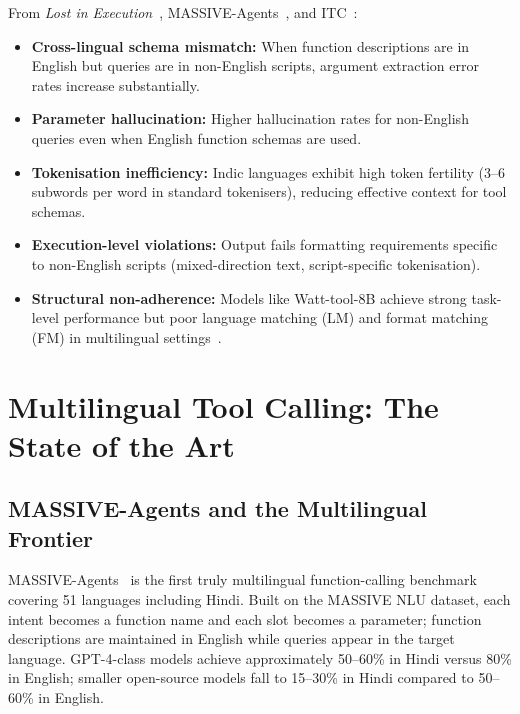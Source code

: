 \documentclass[11pt]{article}
\begin{document}
From \emph{Lost in Execution}~\citep{lostinexecution2025}, MASSIVE-Agents~\citep{massiveagents2025},
and ITC~\citep{itc2025}:
\begin{itemize}[leftmargin=1.2em, itemsep=2pt]
  \item \textbf{Cross-lingual schema mismatch:} When function descriptions are in English but
        queries are in non-English scripts, argument extraction error rates increase substantially.
  \item \textbf{Parameter hallucination:} Higher hallucination rates for non-English queries even
        when English function schemas are used.
  \item \textbf{Tokenisation inefficiency:} Indic languages exhibit high token fertility
        (3--6 subwords per word in standard tokenisers), reducing effective context for tool schemas.
  \item \textbf{Execution-level violations:} Output fails formatting requirements specific to
        non-English scripts (mixed-direction text, script-specific tokenisation).
  \item \textbf{Structural non-adherence:} Models like Watt-tool-8B achieve strong task-level
        performance but poor language matching (LM) and format matching (FM) in multilingual
        settings~\citep{itc2025}.
\end{itemize}

\section{Multilingual Tool Calling: The State of the Art}
\label{sec:multilingual}

\subsection{MASSIVE-Agents and the Multilingual Frontier}

MASSIVE-Agents~\citep{massiveagents2025} is the first truly multilingual function-calling benchmark
covering 51 languages including Hindi. Built on the MASSIVE NLU dataset, each intent becomes a
function name and each slot becomes a parameter; function descriptions are maintained in English
while queries appear in the target language. GPT-4-class models achieve approximately 50--60\% in
Hindi versus 80\% in English; smaller open-source models fall to 15--30\% in Hindi compared to
50--60\% in English.
\end{document}
